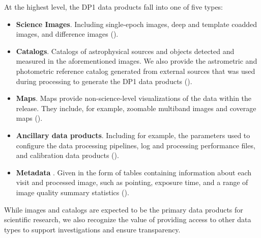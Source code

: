 At the highest level, the \gls{DP1} data products fall into one of five types:
\begin{itemize}
\item \textbf{Science Images}. Including single-\gls{epoch} images, deep and template coadded images, and difference images ().
\item \textbf{Catalogs}. Catalogs of astrophysical sources and objects detected and measured in the aforementioned images. We also provide the astrometric and photometric reference catalog generated from external sources that was used during processing to generate the \gls{DP1} data products ().
\item \textbf{Maps}. Maps provide non-science-level visualizations of the data within the release. They include, for example, zoomable multiband images and coverage maps ().
\item \textbf{Ancillary data products}. Including for example, the parameters used to configure the data processing pipelines, log and processing performance files,  and \gls{calibration} data products ().
\item \textbf{Metadata} . Given in the form of tables containing information about each visit and processed image, such as pointing, exposure time, and a range of image quality summary statistics ().
\end{itemize}
While images and catalogs are expected to be the primary data products for scientific research, we also recognize the value of providing access to other data types to support investigations and ensure transparency.


